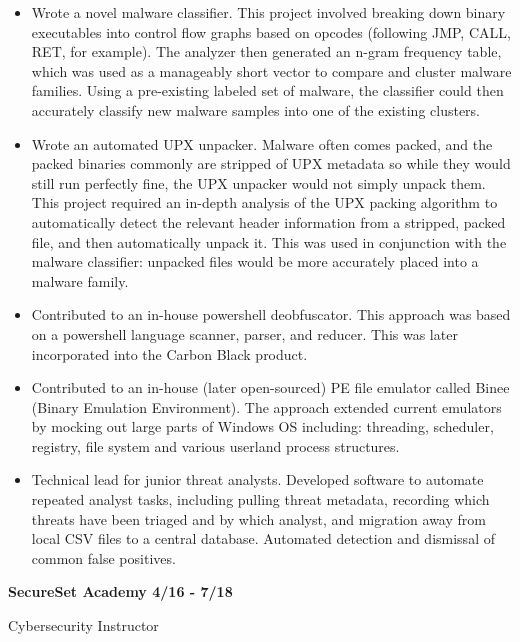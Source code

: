 \documentclass{letter}
\begin{document}
\begin{itemize}
    \setlength\itemsep{-0.5em}

    \item Wrote a novel malware classifier.  This project involved breaking down binary executables into control flow graphs based on opcodes (following JMP, CALL, RET, for example).  The analyzer then generated an n-gram frequency table, which was used as a manageably short vector to compare and cluster malware families.  Using a pre-existing labeled set of malware, the classifier could then accurately classify new malware samples into one of the existing clusters.

    \item Wrote an automated UPX unpacker.  Malware often comes packed, and the packed binaries commonly are stripped of UPX metadata so while they would still run perfectly fine, the UPX unpacker would not simply unpack them.  This project required an in-depth analysis of the UPX packing algorithm to automatically detect the relevant header information from a stripped, packed file, and then automatically unpack it.  This was used in conjunction with the malware classifier: unpacked files would be more accurately placed into a malware family.

    \item Contributed to an in-house powershell deobfuscator.  This approach was based on a powershell language scanner, parser, and reducer.  This was later incorporated into the Carbon Black product.

    \item Contributed to an in-house (later open-sourced) PE file emulator called Binee (Binary Emulation Environment). The approach extended current emulators by mocking out large parts of Windows OS including: threading, scheduler, registry, file system and various userland process structures.

    \item Technical lead for junior threat analysts. Developed software to automate repeated analyst tasks, including pulling threat metadata, recording which threats have been triaged and by which analyst, and migration away from local CSV files to a central database. Automated detection and dismissal of common false positives.

\end{itemize}

\textbf{SecureSet Academy \hfill 4/16 - 7/18}

Cybersecurity Instructor
\end{document}

